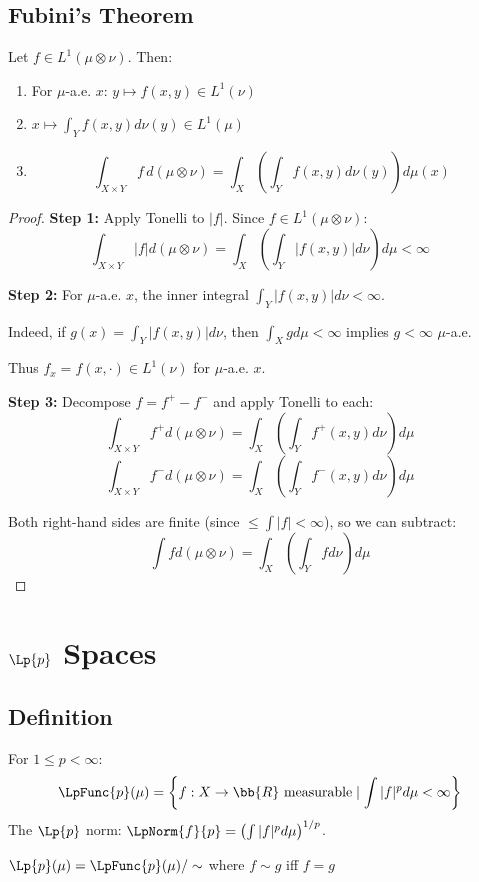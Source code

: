 \section{Fubini's Theorem}

\begin{theorem}[Fubini]
Let $f \in L^1(\mu \otimes \nu)$. Then:
\begin{enumerate}
    \item For $\mu$-a.e. $x$: $y \mapsto f(x, y) \in L^1(\nu)$
    \item $x \mapsto \int_Y f(x, y) d\nu(y) \in L^1(\mu)$
    \item \[ \int_{X \times Y} f \, d(\mu \otimes \nu) = \int_X \left(\int_Y f(x, y) d\nu(y)\right) d\mu(x) \]
\end{enumerate}
\end{theorem}

\begin{proof}
\textbf{Step 1:} Apply Tonelli to $|f|$. Since $f \in L^1(\mu \otimes \nu)$:
\[ \int_{X \times Y} |f| d(\mu \otimes \nu) = \int_X \left(\int_Y |f(x,y)| d\nu\right) d\mu < \infty \]

\textbf{Step 2:} For $\mu$-a.e. $x$, the inner integral $\int_Y |f(x,y)| d\nu < \infty$.

Indeed, if $g(x) = \int_Y |f(x,y)| d\nu$, then $\int_X g d\mu < \infty$ implies $g < \infty$ $\mu$-a.e.

Thus $f_x = f(x, \cdot) \in L^1(\nu)$ for $\mu$-a.e. $x$.

\textbf{Step 3:} Decompose $f = f^+ - f^-$ and apply Tonelli to each:
\[ \int_{X \times Y} f^+ d(\mu \otimes \nu) = \int_X \left(\int_Y f^+(x,y) d\nu\right) d\mu \]
\[ \int_{X \times Y} f^- d(\mu \otimes \nu) = \int_X \left(\int_Y f^-(x,y) d\nu\right) d\mu \]

Both right-hand sides are finite (since $\leq \int |f| < \infty$), so we can subtract:
\[ \int f d(\mu \otimes \nu) = \int_X \left(\int_Y f d\nu\right) d\mu \]
\end{proof}


\chapter{$\Lp{p}$ Spaces}

\section{Definition}

\begin{definition}
For $1 \leq p < \infty$:
\[ \LpFunc{p}(\mu) = \left\{ f: X \to \bb{R} \text{ measurable} \mid \int |f|^p d\mu < \infty \right\} \]
The $\Lp{p}$ norm: $\LpNorm{f}{p} = \left(\int |f|^p d\mu\right)^{1/p}$.

$\Lp{p}(\mu) = \LpFunc{p}(\mu) / \sim$ where $f \sim g$ iff $f = g$ \almosteverywhere{}
\end{definition}

